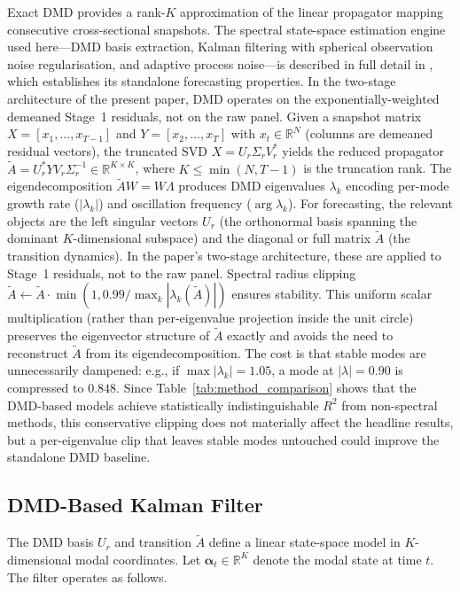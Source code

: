\documentclass[11pt,a4paper]{article}
\newcommand{\R}{\mathbb{R}}
\newcommand{\balpha}{\bm{\alpha}}
\begin{document}
Exact DMD \citep{kutz2016dynamic} provides a rank-$K$ approximation of the linear propagator mapping consecutive cross-sectional snapshots. The spectral state-space estimation engine used here---DMD basis extraction, Kalman filtering with spherical observation noise regularisation, and adaptive process noise---is described in full detail in \citet{roshka2026spectral}, which establishes its standalone forecasting properties. In the two-stage architecture of the present paper, DMD operates on the exponentially-weighted demeaned Stage~1 residuals, not on the raw panel. Given a snapshot matrix $X = [x_1, \ldots, x_{T-1}]$ and $Y = [x_2, \ldots, x_T]$ with $x_t \in \R^N$ (columns are demeaned residual vectors), the truncated SVD $X = U_r \Sigma_r V_r^*$ yields the reduced propagator $\tilde{A} = U_r^* Y V_r \Sigma_r^{-1} \in \R^{K \times K}$, where $K \leq \min(N, T-1)$ is the truncation rank. The eigendecomposition $\tilde{A} W = W \Lambda$ produces DMD eigenvalues $\lambda_k$ encoding per-mode growth rate ($|\lambda_k|$) and oscillation frequency ($\arg \lambda_k$). For forecasting, the relevant objects are the left singular vectors $U_r$ (the orthonormal basis spanning the dominant $K$-dimensional subspace) and the diagonal or full matrix $\tilde{A}$ (the transition dynamics). In the paper's two-stage architecture, these are applied to Stage~1 residuals, not to the raw panel. Spectral radius clipping $\tilde{A} \leftarrow \tilde{A} \cdot \min(1, 0.99 / \max_k |\lambda_k(\tilde{A})|)$ ensures stability. This uniform scalar multiplication (rather than per-eigenvalue projection inside the unit circle) preserves the eigenvector structure of $\tilde{A}$ exactly and avoids the need to reconstruct $\tilde{A}$ from its eigendecomposition. The cost is that stable modes are unnecessarily dampened: e.g., if $\max |\lambda_k| = 1.05$, a mode at $|\lambda| = 0.90$ is compressed to $0.848$. Since Table~\ref{tab:method_comparison} shows that the DMD-based models achieve statistically indistinguishable $R^2$ from non-spectral methods, this conservative clipping does not materially affect the headline results, but a per-eigenvalue clip that leaves stable modes untouched could improve the standalone DMD baseline.

\subsection*{DMD-Based Kalman Filter}

The DMD basis $U_r$ and transition $\tilde{A}$ define a linear state-space model in $K$-dimensional modal coordinates. Let $\balpha_t \in \R^K$ denote the modal state at time $t$. The filter operates as follows.
\end{document}
